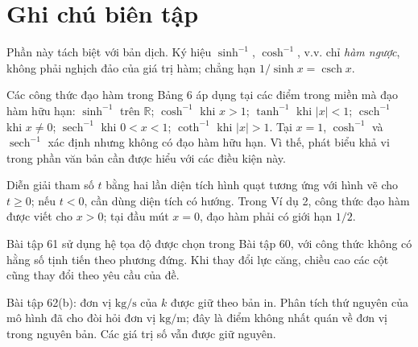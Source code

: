 \documentclass[12pt,a4paper]{article}
\DeclareMathOperator{\sech}{sech}
\DeclareMathOperator{\csch}{csch}
\begin{document}
\clearpage
\section*{Ghi chú biên tập}
Phần này tách biệt với bản dịch. Ký hiệu $\sinh^{-1}$, $\cosh^{-1}$, v.v. chỉ \textit{hàm ngược}, không phải nghịch đảo của giá trị hàm; chẳng hạn $1/\sinh x=\csch x$.

Các công thức đạo hàm trong Bảng 6 áp dụng tại các điểm trong miền mà đạo hàm hữu hạn: $\sinh^{-1}$ trên $\mathbb R$; $\cosh^{-1}$ khi $x>1$; $\tanh^{-1}$ khi $|x|<1$; $\csch^{-1}$ khi $x\ne0$; $\sech^{-1}$ khi $0<x<1$; $\coth^{-1}$ khi $|x|>1$. Tại $x=1$, $\cosh^{-1}$ và $\sech^{-1}$ xác định nhưng không có đạo hàm hữu hạn. Vì thế, phát biểu khả vi trong phần văn bản cần được hiểu với các điều kiện này.

Diễn giải tham số $t$ bằng hai lần diện tích hình quạt tương ứng với hình vẽ cho $t\ge0$; nếu $t<0$, cần dùng diện tích có hướng. Trong Ví dụ 2, công thức đạo hàm được viết cho $x>0$; tại đầu mút $x=0$, đạo hàm phải có giới hạn $1/2$.

Bài tập 61 sử dụng hệ tọa độ được chọn trong Bài tập 60, với công thức không có hằng số tịnh tiến theo phương đứng. Khi thay đổi lực căng, chiều cao các cột cũng thay đổi theo yêu cầu của đề.

Bài tập 62(b): đơn vị $\mathrm{kg/s}$ của $k$ được giữ theo bản in. Phân tích thứ nguyên của mô hình đã cho đòi hỏi đơn vị $\mathrm{kg/m}$; đây là điểm không nhất quán về đơn vị trong nguyên bản. Các giá trị số vẫn được giữ nguyên.
\end{document}
